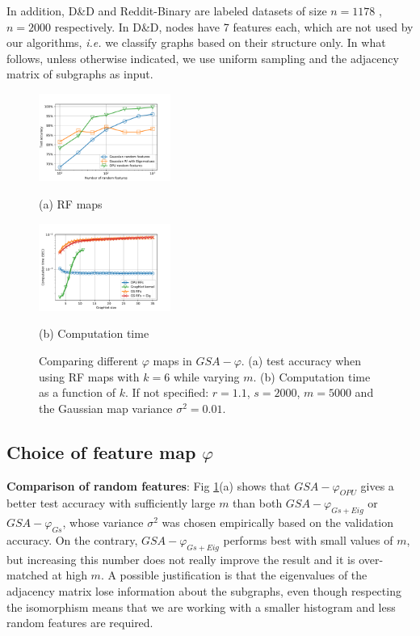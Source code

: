 \documentclass{article}
\begin{document}
In addition, D\&D \cite{DD_ref} and Reddit-Binary \cite{class_Reddit} are  labeled datasets of size $n=1178$ , $n=2000$ respectively.  In D\&D, nodes have 7 features each, which are not used by our algorithms, \emph{i.e.} we  classify  graphs based on their structure only. In what follows, unless otherwise indicated, we use uniform sampling and the adjacency matrix of subgraphs as input.

\begin{figure}[h]
%
\begin{minipage}[b]{.48\linewidth}
  \centering
  \centerline{\includegraphics[width=4.3cm]{figs/phi_comparison.pdf}}
  \centerline{(a) RF maps}\medskip
  \label{subfig:RF_maps}
\end{minipage}
\hfill
\begin{minipage}[b]{0.48\linewidth}
  \centering
  \centerline{\includegraphics[width=4.3cm]{figs/computational_comp.pdf}}
  \centerline{(b) Computation time}\medskip
\end{minipage}
%
\caption{Comparing different $\varphi$ maps in $GSA-\varphi$. (a) test accuracy when using RF maps with $k=6$ while varying $m$. (b) Computation time as a function of $k$. If not specified:  $r=1.1$, $s=2000$, $m=5000$ and the Gaussian map variance $\sigma^2=0.01$. }
\label{fig:diff_phi}
%
\end{figure}

\subsection{Choice of feature map $\varphi$}
\textbf{Comparison of random features}: Fig \ref{fig:diff_phi}(a) shows  that $GSA-\varphi_{OPU}$  gives a better test accuracy with sufficiently large $m$ than both $GSA-\varphi_{Gs+Eig}$  or $GSA-\varphi_{Gs}$, whose variance $\sigma^2$ was chosen empirically based on the validation accuracy. On the contrary, $GSA-\varphi_{Gs+Eig}$ performs best with small values of $m$, but increasing this number does not really improve the result and it is over-matched at high $m$. A possible justification is that the eigenvalues of the adjacency matrix lose information about the subgraphs, even though respecting the isomorphism means that we are working with a smaller histogram and less random features are required.
\end{document}
